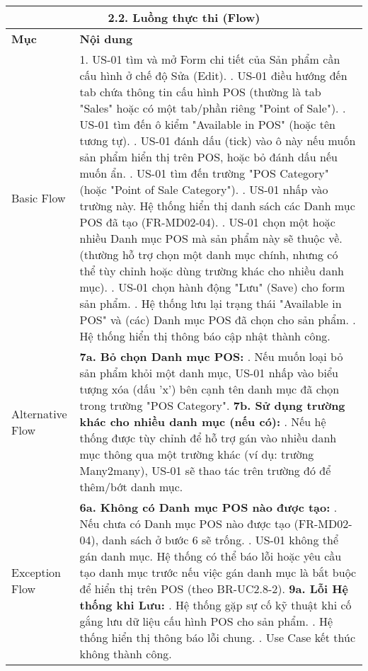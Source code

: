 \begin{longtable}{|m{4cm}|p{11cm}|}
\hline
\multicolumn{2}{|c|}{\textbf{2.2. Luồng thực thi (Flow)}} \\
\hline
\textbf{Mục} & \textbf{Nội dung} \\
\hline
Basic Flow & 1. US-01 tìm và mở Form chi tiết của Sản phẩm cần cấu hình ở chế độ Sửa (Edit). \newline 2. US-01 điều hướng đến tab chứa thông tin cấu hình POS (thường là tab "Sales" hoặc có một tab/phần riêng "Point of Sale"). \newline 3. US-01 tìm đến ô kiểm "Available in POS" (hoặc tên tương tự). \newline 4. US-01 đánh dấu (tick) vào ô này nếu muốn sản phẩm hiển thị trên POS, hoặc bỏ đánh dấu nếu muốn ẩn. \newline 5. US-01 tìm đến trường "POS Category" (hoặc "Point of Sale Category"). \newline 6. US-01 nhấp vào trường này. Hệ thống hiển thị danh sách các Danh mục POS đã tạo (FR-MD02-04). \newline 7. US-01 chọn một hoặc nhiều Danh mục POS mà sản phẩm này sẽ thuộc về. (thường hỗ trợ chọn một danh mục chính, nhưng có thể tùy chỉnh hoặc dùng trường khác cho nhiều danh mục). \newline 8. US-01 chọn hành động "Lưu" (Save) cho form sản phẩm. \newline 9. Hệ thống lưu lại trạng thái "Available in POS" và (các) Danh mục POS đã chọn cho sản phẩm. \newline 10. Hệ thống hiển thị thông báo cập nhật thành công. \\
\hline
Alternative Flow & \textbf{7a. Bỏ chọn Danh mục POS:} \newline    1. Nếu muốn loại bỏ sản phẩm khỏi một danh mục, US-01 nhấp vào biểu tượng xóa (dấu 'x') bên cạnh tên danh mục đã chọn trong trường "POS Category". \newline \textbf{7b. Sử dụng trường khác cho nhiều danh mục (nếu có):} \newline    1. Nếu hệ thống được tùy chỉnh để hỗ trợ gán vào nhiều danh mục thông qua một trường khác (ví dụ: trường Many2many), US-01 sẽ thao tác trên trường đó để thêm/bớt danh mục. \\
\hline
Exception Flow & \textbf{6a. Không có Danh mục POS nào được tạo:} \newline    1. Nếu chưa có Danh mục POS nào được tạo (FR-MD02-04), danh sách ở bước 6 sẽ trống. \newline    2. US-01 không thể gán danh mục. Hệ thống có thể báo lỗi hoặc yêu cầu tạo danh mục trước nếu việc gán danh mục là bắt buộc để hiển thị trên POS (theo BR-UC2.8-2). \newline \textbf{9a. Lỗi Hệ thống khi Lưu:} \newline    1. Hệ thống gặp sự cố kỹ thuật khi cố gắng lưu dữ liệu cấu hình POS cho sản phẩm. \newline    2. Hệ thống hiển thị thông báo lỗi chung. \newline    3. Use Case kết thúc không thành công. \\

\end{longtable}
